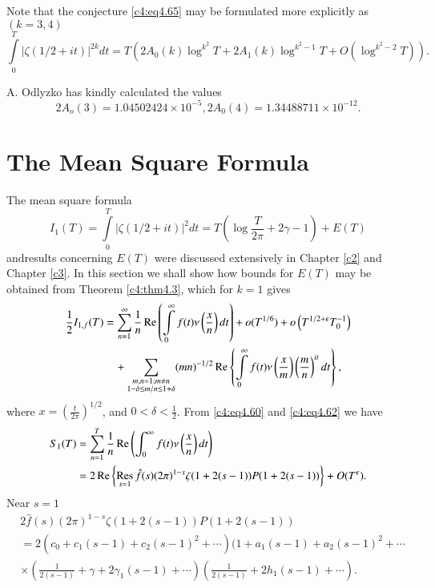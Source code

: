 Note that the conjecture \eqref{c4:eq4.65} may be formulated more
explicitly as $(k=3,4)$
{\fontsize{10pt}{12pt}\selectfont
$$
\int\limits_0^T  |\zeta (1/2 + it)|^{2k} dt = T \left(2A_0 (k) \log^{k^2} T
+ 2A_1 (k) \log^{k^2-1} T + O (\log^{k^2 -2}T)\right).
$$}

A. Odlyzko has kindly calculated the values
$$
2 A_o (3) = 1.04502424 \times 10^{-5}, 2 A_0 (4) = 1.34488711 \times 10^{-12}.
$$

\section{The Mean Square Formula}\label{c4:sec4.5}

The mean square formula
$$
I_1 (T) = \int\limits_0^T |\zeta(1/2 +it)|^2 dt = T \left(\log
\frac{T}{2\pi} + 2 \gamma -1 \right) + E(T)
$$
and\pageoriginale results concerning $E(T)$ were discussed
extensively in Chapter \ref{c2} and Chapter \ref{c3}. In this section
we shall show 
how bounds for $E(T)$ may be obtained from Theorem \ref{c4:thm4.3},
which for $k=1$ gives
\begin{align*}
  \frac{1}{2} I_{1, f} (T) &= \sum_{n=1}^\infty \frac{1}{n} \operatorname{Re}
  \left(\int\limits_0^\infty f(t) \nu \left(\frac{x}{n} \right)dt
  \right) + o(T^{1/6}) + o\left(T^{1/2 + \epsilon} T^{-1}_0\right)\\
&\quad  + \sum_{\substack{m, n=1; m \neq n\\ 1 - \delta \leq m/n \leq 1+
      \delta}} (mn)^{-1/2} \operatorname{Re} \left\{\int\limits_0^\infty f(t) \nu
  \left(\frac{x}{m}\right) \left(\frac{m}{n} \right)^{it}dt \right\} ,
\end{align*}
where $x= \left(\frac{t}{2 \pi} \right)^{1/2}$, and $0 < \delta <
\frac{1}{2}$. From \eqref{c4:eq4.60} and \eqref{c4:eq4.62} we have
\begin{align}
  S_1 (T) & = \sum_{n=1}^T \frac{1}{n} \operatorname{Re} \left(\int_0^\infty f(t)
  \nu \left(\frac{x}{n} \right)dt \right)\label{c4:eq4.68}\\
  & = 2 \operatorname{Re} \left\{\mathop{\operatorname{Res}}_{s=1} \hat{f} (s) (2 \pi)^{1-s} \zeta
  (1+ 2 (s-1)) P (1+2(s-1))\right\} + O (T^\epsilon).\notag
\end{align}
\indent
Near $s=1$
\begin{align*}
&  2 \hat{f} (s) (2 \pi)^{1-s} \zeta (1+2 (s-1)) P(1+2(s-1))\\
&  = 2\left(c_0 + c_1 (s-1) + c_2 (s-1)^2 + \cdots\right) (1+ a_1 (s-1) + a_2
  (s-1)^2 + \cdots\\
&  \times \left(\frac{1}{2 (s-1)} + \gamma + 2 \gamma_1 (s-1) + \cdots
  \right) \left(\frac{1}{2(s-1)} + 2h_1 (s-1) + \cdots \right).
\end{align*}

